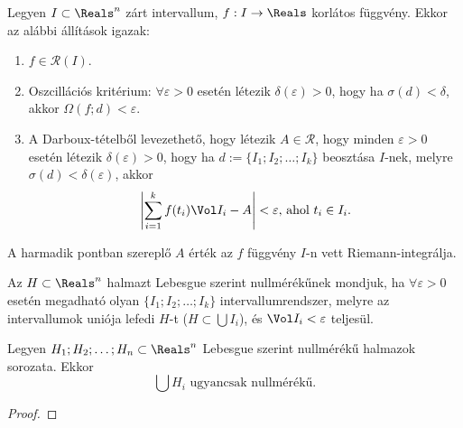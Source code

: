 
\begin{theorem}
  Legyen $I \subset \Reals^n$ zárt intervallum, $f: I \to \Reals$ korlátos
  függvény. Ekkor az alábbi állítások igazak:
  \begin{enumerate}
    \item $f \in \mathcal R(I)$.
    \item Oszcillációs kritérium: $\forall \varepsilon > 0$ esetén létezik
          $\delta(\varepsilon) > 0$, hogy ha $\sigma(d) < \delta$, akkor
          $\Omega(f; d) < \varepsilon$.
    \item A Darboux-tételből levezethető, hogy létezik $A \in \mathcal R$, hogy
          minden $\varepsilon > 0$ esetén létezik $\delta(\varepsilon) > 0$,
          hogy ha $d := \{ I_1; I_2; \ldots; I_k \}$ beosztása $I$-nek, melyre
          $\sigma(d) < \delta(\varepsilon)$, akkor
          $$
            \left|\sum_{i = 1}^k f(t_i) \Vol I_i - A\right| < \varepsilon
            \text{, ahol } t_i \in I_i
            \text.
          $$
  \end{enumerate}
\end{theorem}

\begin{note}
  A harmadik pontban szereplő $A$ érték az $f$ függvény $I$-n vett
  Riemann-integrálja.
\end{note}

\begin{definition}
  Az $H \subset \Reals^n$ halmazt Lebesgue szerint nullmérékűnek mondjuk, ha
  $\forall \varepsilon > 0$ esetén megadható olyan $\{ I_1; I_2; \ldots; I_k \}$
  intervallumrendszer, melyre az intervallumok uniója lefedi $H$-t
  ($H \subset \bigcup I_i$), és $\Vol I_i < \varepsilon$ teljesül.
\end{definition}

\begin{statement}
  Legyen $H_1; H_2; \ldots; H_n \subset \Reals^n$ Lebesgue szerint nullmérékű
  halmazok sorozata. Ekkor $$\bigcup H_i \text{ ugyancsak nullmérékű.}$$

  \begin{proof}
    \vspace{20em}
  \end{proof}
\end{statement}


